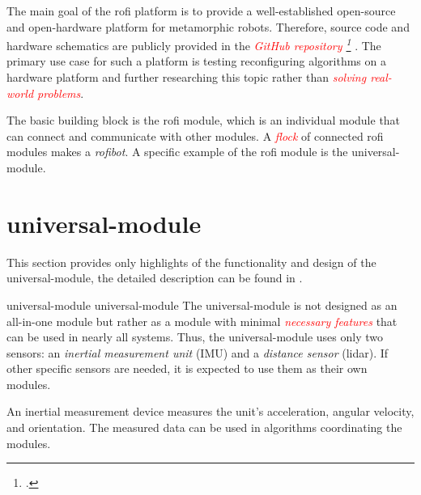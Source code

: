 \documentclass[
  digital,     %
  oneside,     %
  nosansbold,  %
  nocolorbold, %
  nolof,         %
  nolot,         %
]{fithesis4}
\newcommand{\TODO}[1]{\textcolor{red}{\textit{#1}}}
\newcommand{\TODOLIST}[1]{}
\begin{document}
The main goal of the \acrshort{rofi} platform is to provide a well-established open-source and open-hardware platform for metamorphic robots. Therefore, source code and hardware schematics are publicly provided in the \TODO{ GitHub repository \footcite[\url{https://github.com/paradise-fi/RoFI}]{rofi-github} }. The primary use case for such a platform is testing reconfiguring algorithms on a hardware platform and further researching this topic rather than \TODO{solving real-world problems}.

The basic building block is the \acrshort{rofi} module, which is an individual module that can connect and communicate with other modules. A \TODO{flock} of connected \acrshort{rofi} modules makes a \emph{\gls{rofibot}}. A specific example of the \acrshort{rofi} module is the \gls{universal-module}.


\section[ Universal Module ]{ \gls{universal-module} }
\TODOLIST{
    \begin{itemize}
        \item ESP32
        \item \acrshort{spi}
        \item \acrshort{uart}
        \item accumulator
        \item EXT and INT power lines
        \item 3 motors
        \item 6 docks
    \end{itemize}
}
This section provides only highlights of the functionality and design of the \gls{universal-module}, the detailed description can be found in \cite[chapter~3]{Mrazek2019thesis}.

\gls{universal-module} \glsdesc{universal-module} The \gls{universal-module} is not designed as an all-in-one module but rather as a module with minimal \TODO{necessary features} that can be used in nearly all systems. Thus, the \gls{universal-module} uses only two sensors: an \emph{inertial measurement unit} (IMU) and a \emph{distance sensor} (\acrshort{lidar}). If other specific sensors are needed, it is expected to use them as their own modules.

An inertial measurement device measures the unit's acceleration, angular velocity, and orientation. The measured data can be used in algorithms coordinating the modules.
\end{document}
